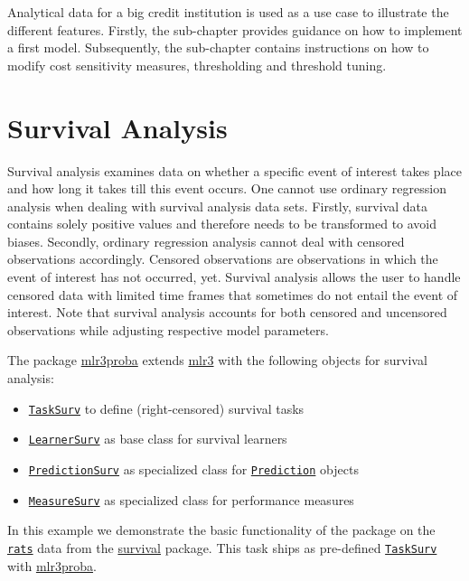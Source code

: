 \documentclass[]{scrbook}
\providecommand{\tightlist}{%
  \setlength{\itemsep}{0pt}\setlength{\parskip}{0pt}}
\begin{document}
Analytical data for a big credit institution is used as a use case to illustrate the different features.
Firstly, the sub-chapter provides guidance on how to implement a first model.
Subsequently, the sub-chapter contains instructions on how to modify cost sensitivity measures, thresholding and threshold tuning.

\hypertarget{survival}{%
\section{Survival Analysis}\label{survival}}

Survival analysis examines data on whether a specific event of interest takes place and how long it takes till this event occurs.
One cannot use ordinary regression analysis when dealing with survival analysis data sets.
Firstly, survival data contains solely positive values and therefore needs to be transformed to avoid biases.
Secondly, ordinary regression analysis cannot deal with censored observations accordingly.
Censored observations are observations in which the event of interest has not occurred, yet.
Survival analysis allows the user to handle censored data with limited time frames that sometimes do not entail the event of interest.
Note that survival analysis accounts for both censored and uncensored observations while adjusting respective model parameters.

The package \href{https://mlr3proba.mlr-org.com}{mlr3proba} extends \href{https://mlr3.mlr-org.com}{mlr3} with the following objects for survival analysis:

\begin{itemize}
\tightlist
\item
  \href{https://mlr3proba.mlr-org.com/reference/TaskSurv.html}{\texttt{TaskSurv}} to define (right-censored) survival tasks
\item
  \href{https://mlr3proba.mlr-org.com/reference/LearnerSurv.html}{\texttt{LearnerSurv}} as base class for survival learners
\item
  \href{https://mlr3proba.mlr-org.com/reference/PredictionSurv.html}{\texttt{PredictionSurv}} as specialized class for \href{https://mlr3.mlr-org.com/reference/Prediction.html}{\texttt{Prediction}} objects
\item
  \href{https://mlr3proba.mlr-org.com/reference/MeasureSurv.html}{\texttt{MeasureSurv}} as specialized class for performance measures
\end{itemize}

In this example we demonstrate the basic functionality of the package on the \href{https://www.rdocumentation.org/packages/survival/topics/rats}{\texttt{rats}} data from the \href{https://cran.r-project.org/package=survival}{survival} package.
This task ships as pre-defined \href{https://mlr3proba.mlr-org.com/reference/TaskSurv.html}{\texttt{TaskSurv}} with \href{https://mlr3proba.mlr-org.com}{mlr3proba}.
\end{document}
